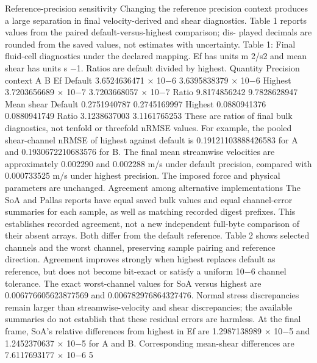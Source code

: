 \documentclass[11pt]{article}
\begin{document}
Reference-precision sensitivity
Changing the reference precision context produces a large separation in final velocity-derived and
shear diagnostics. Table 1 reports values from the paired default-versus-highest comparison; dis-
played decimals are rounded from the saved values, not estimates with uncertainty.
Table 1: Final fluid-cell diagnostics under the declared mapping. Ef has units m 2/s2 and mean
shear has units s \ensuremath{-}1. Ratios are default divided by highest.
Quantity Precision context A B
Ef Default 3.6524636471 \ensuremath{\times} 10\ensuremath{-}6 3.6395838379 \ensuremath{\times} 10\ensuremath{-}6
Highest 3.7203656689 \ensuremath{\times} 10\ensuremath{-}7 3.7203668057 \ensuremath{\times} 10\ensuremath{-}7
Ratio 9.8174856242 9.7828628947
Mean shear Default 0.2751940787 0.2745169997
Highest 0.0880941376 0.0880941749
Ratio 3.1238637003 3.1161765253
These are ratios of final bulk diagnostics, not tenfold or threefold nRMSE values. For example,
the pooled shear-channel nRMSE of highest against default is 0.19121103888426583 for A and
0.1930672210683576 for B. The final mean streamwise velocities are approximately 0.002290 and
0.002288 m/s under default precision, compared with 0.000733525 m/s under highest precision.
The imposed force and physical parameters are unchanged.
Agreement among alternative implementations
The SoA and Pallas reports have equal saved bulk values and equal channel-error summaries for
each sample, as well as matching recorded digest prefixes. This establishes recorded agreement,
not a new independent full-byte comparison of their absent arrays. Both differ from the default
reference. Table 2 shows selected channels and the worst channel, preserving sample pairing and
reference direction.
Agreement improves strongly when highest replaces default as reference, but does not become
bit-exact or satisfy a uniform 10\ensuremath{-}6 channel tolerance. The exact worst-channel values for SoA
versus highest are 0.006776605623877569 and 0.006782976864327476. Normal stress discrepancies
remain larger than streamwise-velocity and shear discrepancies; the available summaries do not
establish that these residual errors are harmless.
At the final frame, SoA’s relative differences from highest in Ef are 1.2987138989 \ensuremath{\times} 10\ensuremath{-}5 and
1.2452370637 \ensuremath{\times} 10\ensuremath{-}5 for A and B. Corresponding mean-shear differences are 7.6117693177 \ensuremath{\times} 10\ensuremath{-}6
5
\end{document}
